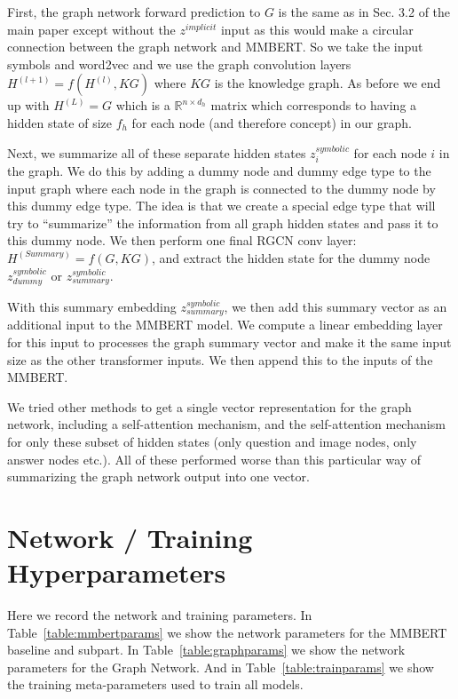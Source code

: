 \documentclass[final]{cvpr}
\providecommand{\MMBERTAbr}{MMBERT\xspace}
\begin{document}
First, the graph network forward prediction to $G$ is the same as in Sec. 3.2 of the main paper except without the $z^{implicit}$ input as this would make a circular connection between the graph network and \MMBERTAbr. So we take the input symbols and word2vec and we use the graph convolution layers $H^{(l+1)} = f(H^{(l)}, KG)$ where $KG$ is the knowledge graph. As before we end up with $H^{(L)} = G$ which is a $\mathbb{R}^{n \times d_h}$ matrix which corresponds to having a hidden state of size $f_h$ for each node (and therefore concept) in our graph.

Next, we summarize all of these separate hidden states $z_{i}^{symbolic}$ for each node $i$ in the graph. We do this by adding a dummy node and dummy edge type to the input graph where each node in the graph is connected to the dummy node by this dummy edge type. The idea is that we create a special edge type that will try to ``summarize'' the information from all graph hidden states and pass it to this dummy node. We then perform one final RGCN conv layer: $H^{(Summary)} = f(G, KG)$, and extract the hidden state for the dummy node $z_{dummy}^{symbolic}$ or $z_{summary}^{symbolic}$. 

With this summary embedding $z_{summary}^{symbolic}$, we then add this summary vector as an additional input to the \MMBERTAbr model. We compute a linear embedding layer for this input to processes the graph summary vector and make it the same input size as the other transformer inputs. We then append this to the inputs of the \MMBERTAbr. 

We tried other methods to get a single vector representation for the graph network, including a self-attention mechanism, and the self-attention mechanism for only these subset of hidden states (only question and image nodes, only answer nodes etc.). All of these performed worse than this particular way of summarizing the graph network output into one vector.

\section{Network / Training Hyperparameters}
\label{appx:hyper}
Here we record the network and training parameters.
In Table~\ref{table:mmbertparams} we show the network parameters for the \MMBERTAbr baseline and subpart.
In Table~\ref{table:graphparams} we show the network parameters for the Graph Network. 
And in Table~\ref{table:trainparams} we show the training meta-parameters used to train all models.
\end{document}
